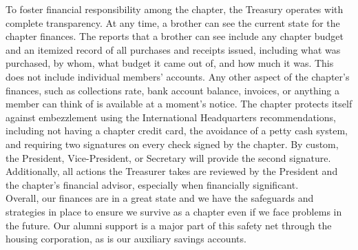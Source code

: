     To foster financial responsibility among the chapter, the Treasury operates with complete transparency. At any time, a brother can see the current state for the chapter finances. The reports that a brother can see include any chapter budget and an itemized record of all purchases and receipts issued, including what was purchased, by whom, what budget it came out of, and how much it was. This does not include individual members' accounts. Any other aspect of the chapter's finances, such as collections rate, bank account balance, invoices, or anything a member can think of is available at a moment's notice. The chapter protects itself against embezzlement using the International Headquarters recommendations, including not having a chapter credit card, the avoidance of a petty cash system, and requiring two signatures on every check signed by the chapter. By custom, the President, Vice-President, or Secretary will provide the second signature. Additionally, all actions the Treasurer takes are reviewed by the President and the chapter’s financial advisor, especially when financially significant. \\

    Overall, our finances are in a great state and we have the safeguards and strategies in place to ensure we survive as a chapter even if we face problems in the future. Our alumni support is a major part of this safety net through the housing corporation, as is our auxiliary savings accounts.